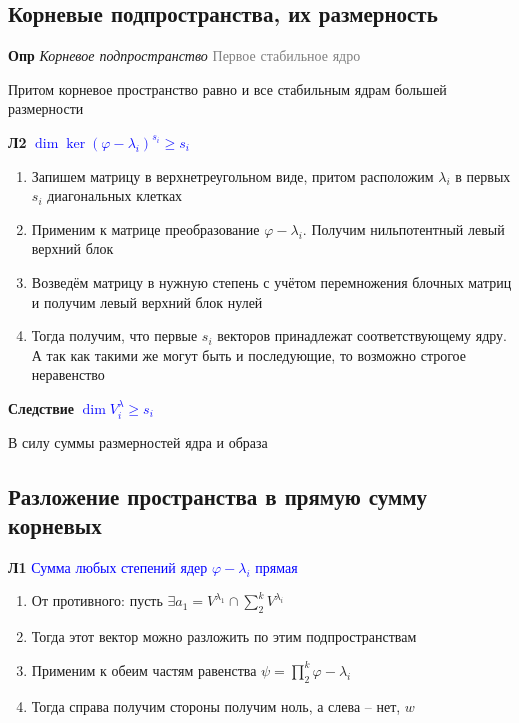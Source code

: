 \subsection{Корневые подпространства, их размерность}

\textbf{Опр} \textit{Корневое подпространство} \textcolor{gray}{Первое стабильное ядро}

Притом корневое пространство равно и все стабильным ядрам большей размерности

\textbf{Л2} \textcolor{blue}{$\dim \ker (\varphi - \lambda_i)^{s_i} \geq s_i$}

\begin{enumerate}
    \item Запишем матрицу в верхнетреугольном виде, притом расположим $\lambda_i$ в первых $s_i$ диагональных
    клетках
    \item Применим к матрице преобразование $\varphi - \lambda_i$.
    Получим нильпотентный левый верхний блок
    \item Возведём матрицу в нужную степень с учётом перемножения блочных матриц и получим левый верхний блок нулей
    \item Тогда получим, что первые $s_i$ векторов принадлежат соответствующему ядру.
    А так как такими же могут быть и последующие, то возможно строгое неравенство
\end{enumerate}

\textbf{Следствие} \textcolor{blue}{$\dim V^\lambda_i \geq s_i$}

В силу суммы размерностей ядра и образа

\subsection{Разложение пространства в прямую сумму корневых}

\textbf{Л1} \textcolor{blue}{Сумма любых степений ядер $\varphi - \lambda_i$ прямая}

\begin{enumerate}
    \item От противного: пусть $\exists a_1 = V^{\lambda_1} \cap \sum_2^k V^{\lambda_i}$
    \item Тогда этот вектор можно разложить по этим подпространствам
    \item Применим к обеим частям равенства $\psi = \prod_2^k \varphi - \lambda_i$
    \item Тогда справа получим стороны получим ноль, а слева -- нет, $w$
\end{enumerate}

